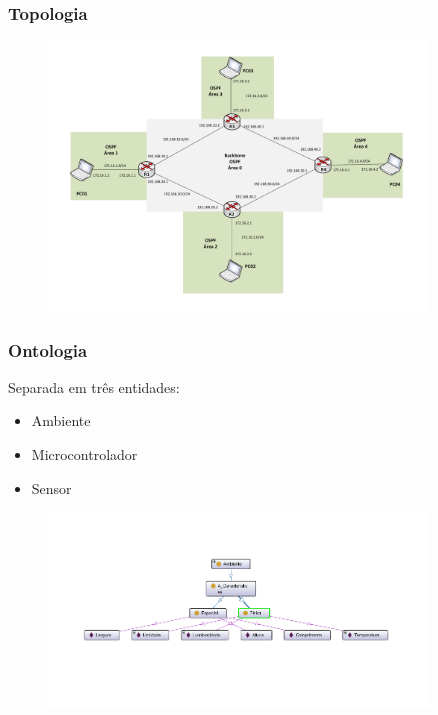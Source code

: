 
\begin{frame}
	\frametitle{Topologia}

	\begin{figure}[h]
		\centering
		\includegraphics[width=0.9\textwidth]{"../Relatorio/Artigo IoT-G4/figs/topologia-2"}
		\label{topologia}
 	\end{figure}

\end{frame}


\begin{frame}
	\frametitle{Ontologia}
	Separada em três entidades:
	\begin{itemize}
		\item Ambiente
		\item Microcontrolador
		\item Sensor
	\end{itemize}

	\begin{figure}[h]
		\centering
		\includegraphics[width=0.9\textwidth]{"../Relatorio/Artigo IoT-G4/figs/Ambiente"}
		\label{topologia}
 	\end{figure}

\end{frame}

